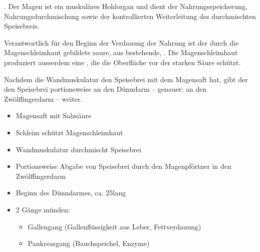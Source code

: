 {%
%
%
%
.
Der Magen ist ein muskuläres Hohlorgan und dient der
Nahrungsspeicherung, Nahrungsdurchmischung sowie der
kontrollierten Weiterleitung des durchmischten Speisebreis.

Verantwortlich für den Beginn der Verdauung der Nahrung ist
der durch die Magenschleimhaut gebildete saure, aus
 bestehende, . Die
Magenschleimhaut produziert ausserdem eine , die die Oberfläche vor der starken Säure
schützt.

Nachdem die Wandmuskulatur den Speisebrei mit dem Magensaft
 hat, gibt der 
 den Speisebrei portionsweise an den Dünndarm
-- genauer: an den Zwölffingerdarm -- weiter.
}{
\begin{itemize}
  \item Magensaft mit Salzsäure
  \item Schleim schützt Magenschleimhaut
  \item Wandmuskulatur durchmischt Speisebrei
  \item Portionsweise Abgabe von Speisebrei durch den
  Magenpförtner in
  den Zwölffingerdarm
\end{itemize}
}{}{}{}






{%
\begin{itemize}
  \item Beginn des Dünndarmes, ca. 25\CM* lang
  \item 2 Gänge münden:
  \begin{itemize}
    \item Gallengang (Gallenflüssigkeit aus Leber, Fettverdauung)
    \item Pankreasgang (Bauchspeichel, Enzyme)
  \end{itemize}
\end{itemize}
}{}{}{}



